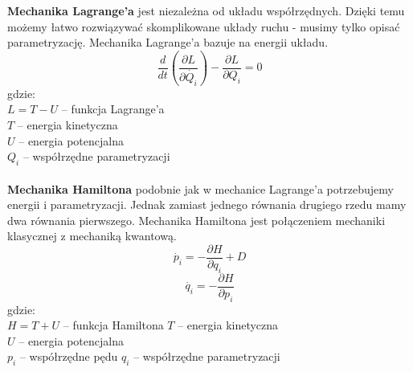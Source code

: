 \documentclass[12pt]{article}
\begin{document}
\textbf{Mechanika Lagrange'a} jest niezależna od układu współrzędnych. Dzięki temu możemy łatwo rozwiązywać skomplikowane układy ruchu - musimy tylko opisać parametryzację. Mechanika Lagrange'a bazuje na energii układu. 
$$ \dfrac{d}{dt} (\dfrac{\partial L}{\partial\dot{Q_{i}}}) - \dfrac{\partial L}{\partial Q_{i}} = 0$$
gdzie: \\
$L = T - U$ -- funkcja Lagrange'a\\
$T$ -- energia kinetyczna \\
$U$ -- energia potencjalna \\
$Q_{i}$ -- współrzędne parametryzacji\\
~\\
\textbf{Mechanika Hamiltona} podobnie jak w mechanice Lagrange'a potrzebujemy energii i parametryzacji. Jednak zamiast jednego równania drugiego rzedu mamy dwa równania pierwszego. Mechanika Hamiltona jest połączeniem mechaniki klasycznej z mechaniką kwantową.
$$ \dot{p_{i}} = - \dfrac{\partial H}{\partial q_{i}} + D $$
$$ \dot{q_{i}} = - \dfrac{\partial H}{\partial p_{i}} $$
gdzie: \\
$H = T + U $ -- funkcja Hamiltona
$T$ -- energia kinetyczna \\
$U$ -- energia potencjalna \\
$p_{i}$ -- współrzędne pędu
$q_{i}$ -- współrzędne parametryzacji
\end{document}

